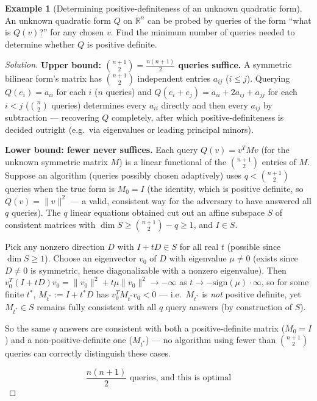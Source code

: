 \documentclass[11pt]{article}
\theoremstyle{definition}
\newtheorem{example}{Example}[section]
\newcommand{\R}{\mathbb{R}}
\begin{document}
\begin{example}[Determining positive-definiteness of an unknown quadratic form]
An unknown quadratic form $Q$ on $\R^n$ can be probed by queries of the form ``what is $Q(v)$?'' for any chosen $v$. Find the minimum number of queries needed to determine whether $Q$ is positive definite.
\end{example}
\begin{proof}[Solution]
\textbf{Upper bound: $\binom{n+1}2=\frac{n(n+1)}2$ queries suffice.} A symmetric bilinear form's matrix has $\binom{n+1}2$ independent entries $a_{ij}$ ($i\le j$). Querying $Q(e_i)=a_{ii}$ for each $i$ ($n$ queries) and $Q(e_i+e_j)=a_{ii}+2a_{ij}+a_{jj}$ for each $i<j$ ($\binom n2$ queries) determines every $a_{ii}$ directly and then every $a_{ij}$ by subtraction — recovering $Q$ completely, after which positive-definiteness is decided outright (e.g.\ via eigenvalues or leading principal minors).

\textbf{Lower bound: fewer never suffices.} Each query $Q(v)=v^TMv$ (for the unknown symmetric matrix $M$) is a linear functional of the $\binom{n+1}2$ entries of $M$. Suppose an algorithm (queries possibly chosen adaptively) uses $q<\binom{n+1}2$ queries when the true form is $M_0=I$ (the identity, which is positive definite, so $Q(v)=\|v\|^2$ — a valid, consistent way for the adversary to have answered all $q$ queries). The $q$ linear equations obtained cut out an affine subspace $S$ of consistent matrices with $\dim S\ge\binom{n+1}2-q\ge1$, and $I\in S$.

Pick any nonzero direction $D$ with $I+tD\in S$ for all real $t$ (possible since $\dim S\ge1$). Choose an eigenvector $v_0$ of $D$ with eigenvalue $\mu\ne0$ (exists since $D\ne0$ is symmetric, hence diagonalizable with a nonzero eigenvalue). Then $v_0^T(I+tD)v_0=\|v_0\|^2+t\mu\|v_0\|^2\to-\infty$ as $t\to-\mathrm{sign}(\mu)\cdot\infty$, so for some finite $t^*$, $M_{t^*}:=I+t^*D$ has $v_0^TM_{t^*}v_0<0$ — i.e.\ $M_{t^*}$ is \emph{not} positive definite, yet $M_{t^*}\in S$ remains fully consistent with all $q$ query answers (by construction of $S$).

So the same $q$ answers are consistent with both a positive-definite matrix ($M_0=I$) and a non-positive-definite one ($M_{t^*}$) — no algorithm using fewer than $\binom{n+1}2$ queries can correctly distinguish these cases.

\[
\boxed{\dfrac{n(n+1)}2\text{ queries, and this is optimal}}
\]
\end{proof}
\end{document}
